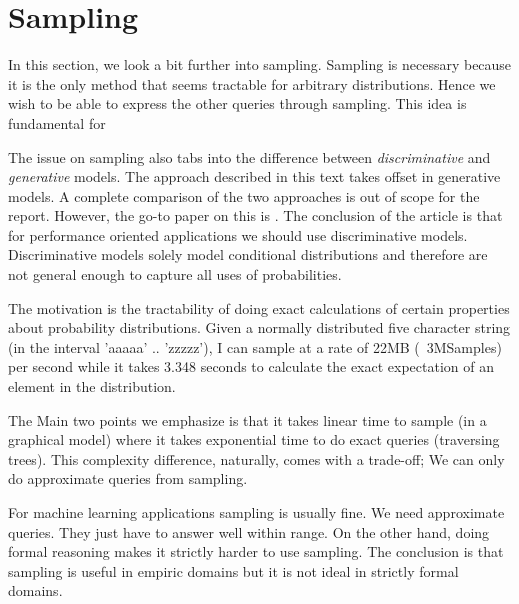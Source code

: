 \section{Sampling}
In this section, we look a bit further into sampling. Sampling is necessary
because it is the only method that seems tractable for arbitrary
distributions. Hence we wish to be able to express the other queries through
sampling. This idea is fundamental for \cite{Park:2008, Mansinghka:2009, Scibior:2015}

The issue on sampling also tabs into the difference between
\emph{discriminative} and \emph{generative} models.
The approach described in this text takes offset in generative models. A complete comparison of the two
approaches is out of scope for the report. However, the go-to paper on this
is \cite{Ng:2002}. The conclusion of the article is that for performance oriented applications
we should use discriminative models. Discriminative models solely
model conditional distributions and therefore are not general enough to capture
all uses of probabilities.

The motivation is the tractability of doing exact calculations of certain properties
about probability distributions. Given a normally distributed five character string (in the
interval 'aaaaa' .. 'zzzzz'), I can sample at a rate of 22MB (~3MSamples) per second
while it takes 3.348 seconds to calculate the exact expectation of an element in
the distribution.

The Main two points we emphasize is that it takes linear time to sample (in a graphical
model) where it takes exponential time to do exact queries (traversing trees). This complexity difference,
naturally, comes with a trade-off; We can only do approximate queries from sampling.

For machine learning applications sampling is usually fine. We need approximate
queries. They just have to answer well within range. On the other hand, doing
formal reasoning makes it strictly harder to use sampling. The conclusion is that
sampling is useful in empiric domains but it is not ideal in 
strictly formal domains.